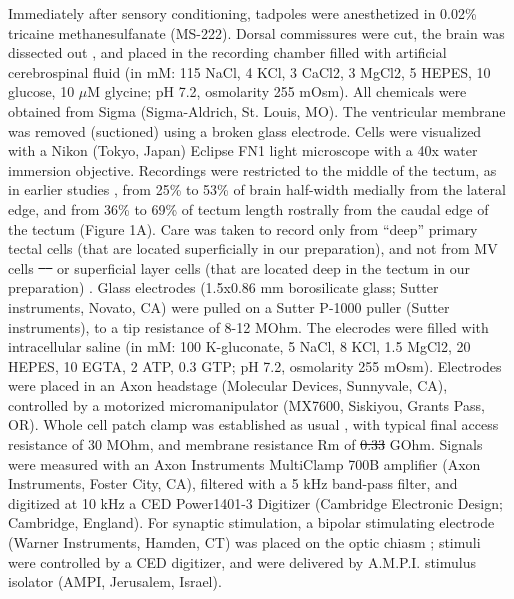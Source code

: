 \documentclass{article}
\providecommand{\DIFaddtex}[1]{{\protect\color{blue}\uwave{#1}}} %
\providecommand{\DIFdeltex}[1]{{\protect\color{red}\sout{#1}}}                      %
\providecommand{\DIFaddbegin}{} %
\providecommand{\DIFaddend}{} %
\providecommand{\DIFdelbegin}{} %
\providecommand{\DIFdelend}{} %
\providecommand{\DIFadd}[1]{\texorpdfstring{\DIFaddtex{#1}}{#1}} %
\providecommand{\DIFdel}[1]{\texorpdfstring{\DIFdeltex{#1}}{}} %
\newcommand{\DIFscaledelfig}{0.5}
\newlength{\DIFdelgraphicswidth} %
\newlength{\DIFdelgraphicsheight} %
\newcommand{\DIFaddincludegraphics}[2][]{{\color{blue}\fbox{\DIFOincludegraphics[#1]{#2}}}} %
\newcommand{\DIFdelincludegraphics}[2][]{%
\sbox{\DIFdelgraphicsbox}{\DIFOincludegraphics[#1]{#2}}%
\settoboxwidth{\DIFdelgraphicswidth}{\DIFdelgraphicsbox} %
\settoboxtotalheight{\DIFdelgraphicsheight}{\DIFdelgraphicsbox} %
\scalebox{\DIFscaledelfig}{%
\parbox[b]{\DIFdelgraphicswidth}{\usebox{\DIFdelgraphicsbox}\\[-\baselineskip] \rule{\DIFdelgraphicswidth}{0em}}\llap{\resizebox{\DIFdelgraphicswidth}{\DIFdelgraphicsheight}{%
\setlength{\unitlength}{\DIFdelgraphicswidth}%
\begin{picture}(1,1)%
\thicklines\linethickness{2pt} %
{\color[rgb]{1,0,0}\put(0,0){\framebox(1,1){}}}%
{\color[rgb]{1,0,0}\put(0,0){\line( 1,1){1}}}%
{\color[rgb]{1,0,0}\put(0,1){\line(1,-1){1}}}%
\end{picture}%
}\hspace*{3pt}}} %
} %
\DeclareRobustCommand{\DIFaddbegin}{\DIFOaddbegin \let\includegraphics\DIFaddincludegraphics} %
\DeclareRobustCommand{\DIFaddend}{\DIFOaddend \let\includegraphics\DIFOincludegraphics} %
\DeclareRobustCommand{\DIFdelbegin}{\DIFOdelbegin \let\includegraphics\DIFdelincludegraphics} %
\DeclareRobustCommand{\DIFdelend}{\DIFOaddend \let\includegraphics\DIFOincludegraphics} %
\begin{document}
Immediately after sensory conditioning, tadpoles were anesthetized in 0.02\% tricaine methanesulfanate (MS-222). Dorsal commissures were cut, the brain was dissected out \citep{aizenman2003,ciarleglio2015}, and placed in the recording chamber filled with artificial cerebrospinal fluid (in mM: 115 NaCl, 4 KCl, 3 CaCl2, 3 MgCl2, 5 HEPES, 10 glucose, 10 $\mu$M glycine; pH 7.2, osmolarity 255 mOsm). All chemicals were obtained from Sigma (Sigma-Aldrich, St. Louis, MO). The ventricular membrane was removed (suctioned) using a broken glass electrode. Cells were visualized with a Nikon (Tokyo, Japan) Eclipse FN1 light microscope with a 40x water immersion objective. Recordings were restricted to the middle of the tectum, as in earlier studies \citep{ciarleglio2015}, from 25\% to 53\% of brain half-width medially from the lateral edge, and from 36\% to 69\% of tectum length rostrally from the caudal edge of the tectum (Figure 1A). Care was taken to record only from “deep” primary tectal cells (that are located superficially in our preparation), and not from MV cells \DIFdelbegin \DIFdel{\mbox{%
\citep{pratt2009} }\hspace{0pt}%
}\DIFdelend \DIFaddbegin \DIFadd{\mbox{%
\citep{pratt2009trigeminal} }\hspace{0pt}%
}\DIFaddend or superficial layer cells (that are located deep in the tectum in our preparation) \citep{liu2016}. Glass electrodes (1.5x0.86 mm borosilicate glass; Sutter instruments, Novato, CA) were pulled on a Sutter P-1000 puller (Sutter instruments), to a tip resistance of 8-12 MOhm. The elecrodes were filled with intracellular saline (in mM: 100 K-gluconate, 5 NaCl, 8 KCl, 1.5 MgCl2, 20 HEPES, 10 EGTA, 2 ATP, 0.3 GTP; pH 7.2, osmolarity 255 mOsm). Electrodes were placed in an Axon headstage (Molecular Devices, Sunnyvale, CA), controlled by a motorized micromanipulator (MX7600, Siskiyou, Grants Pass, OR). Whole cell patch clamp was established as usual \citep{ciarleglio2015}, with typical final access resistance of 30 MOhm, and membrane resistance Rm of \DIFdelbegin \DIFdel{0.33 }\DIFdelend \DIFaddbegin \DIFadd{3.2 }\DIFaddend GOhm. Signals were measured with an Axon Instruments MultiClamp 700B amplifier (Axon Instruments, Foster City, CA), filtered with a 5 kHz band-pass filter, and digitized at 10 kHz a CED Power1401-3 Digitizer (Cambridge Electronic Design; Cambridge, England). For synaptic stimulation, a bipolar stimulating electrode (Warner Instruments, Hamden, CT) was placed on the optic chiasm \citep{wu1996}; stimuli were controlled by a CED digitizer, and were delivered by A.M.P.I. stimulus isolator (AMPI, Jerusalem, Israel).
\end{document}
